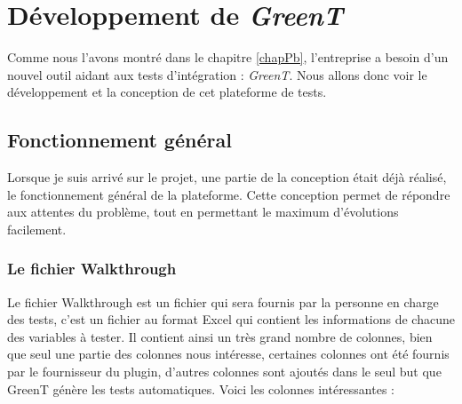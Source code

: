 \chapter{Développement de \textit{GreenT}}
Comme nous l'avons montré dans le chapitre \ref{chapPb}, l'entreprise a besoin d'un nouvel outil aidant aux tests d'intégration : \textit{GreenT}. Nous allons donc voir le développement et la conception de cet plateforme de tests.
	\section{Fonctionnement général}
	Lorsque je suis arrivé sur le projet, une partie de la conception était déjà réalisé, le fonctionnement général de la plateforme. Cette conception permet de répondre aux attentes du problème, tout en permettant le maximum d'évolutions facilement.
	
	\subsection{Le fichier Walkthrough}\label{wt}
		Le fichier Walkthrough est un fichier qui sera fournis par la personne en charge des tests, c'est un fichier au format Excel qui contient les informations de chacune des variables à tester. Il contient ainsi un très grand nombre de colonnes, bien que seul une partie des colonnes nous intéresse, certaines colonnes ont été fournis par le fournisseur du plugin, d'autres colonnes sont ajoutés dans le seul but que GreenT génère les tests automatiques. Voici les colonnes intéressantes : 

